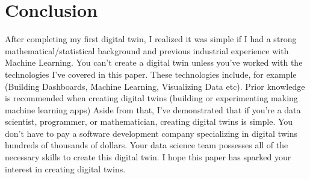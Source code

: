 \section{Conclusion}
After completing my first digital twin, I realized it was simple if I had a strong mathematical/statistical background and previous industrial experience with Machine Learning. You can't create a digital twin unless you've worked with the technologies I've covered in this paper. These technologies include, for example (Building Dashboards, Machine Learning, Visualizing Data etc). Prior knowledge is recommended when creating digital twins (building or experimenting making machine learning apps) Aside from that, I've demonstrated that if you're a data scientist, programmer, or mathematician, creating digital twins is simple. You don't have to pay a software development company specializing in digital twins hundreds of thousands of dollars. Your data science team possesses all of the necessary skills to create this digital twin. I hope this paper has sparked your interest in creating digital twins.